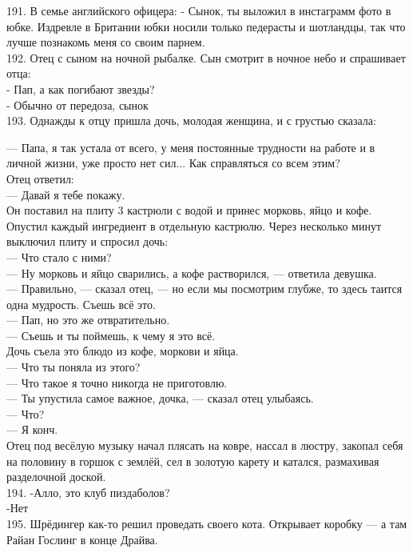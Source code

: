 \documentclass[a4paper,20pt,notitlepage]{extbook}
\begin{document}
	191. В семье английского офицера:
	- Сынок, ты выложил в инстаграмм фото в юбке. Издревле в Британии юбки носили только педерасты и шотландцы, так что лучше познакомь меня со своим парнем.\\
	
	192. Отец с сыном на ночной рыбалке. Сын смотрит в ночное небо и спрашивает отца:\\
	- Пап, а как погибают звезды?\\
	- Обычно от передоза, сынок\\
	
	193. Однажды к отцу пришла дочь, молодая женщина, и с грустью сказала:
	
	— Папа, я так устала от всего, у меня постоянные трудности на работе и в личной жизни, уже просто нет сил... Как справляться со всем этим?\\
	Отец ответил:\\
	— Давай я тебе покажу.\\
	Он поставил на плиту 3 кастрюли с водой и принес морковь, яйцо и кофе. Опустил каждый ингредиент в отдельную кастрюлю. Через несколько минут выключил плиту и спросил дочь:\\
	— Что стало с ними?\\
	— Ну морковь и яйцо сварились, а кофе растворился, — ответила девушка.\\
	— Правильно, — сказал отец, — но если мы посмотрим глубже, то здесь таится одна мудрость. Съешь всё это.\\
	— Пап, но это же отвратительно.\\
	— Съешь и ты поймешь, к чему я это всё.\\
	Дочь съела это блюдо из кофе, моркови и яйца.\\
	— Что ты поняла из этого?\\
	— Что такое я точно никогда не приготовлю.\\
	— Ты упустила самое важное, дочка, — сказал отец улыбаясь.\\
	— Что?\\
	— Я конч.\\
	Отец под весёлую музыку начал плясать на ковре, нассал в люстру, закопал себя на половину в горшок с землёй, сел в золотую карету и катался, размахивая разделочной доской.\\
	
	194. -Алло, это клуб пиздаболов?\\
	-Нет\\
	
	195. Шрёдингер как-то решил проведать своего кота. Открывает коробку — а там Райан Гослинг в конце Драйва.\\
	
\end{document}
